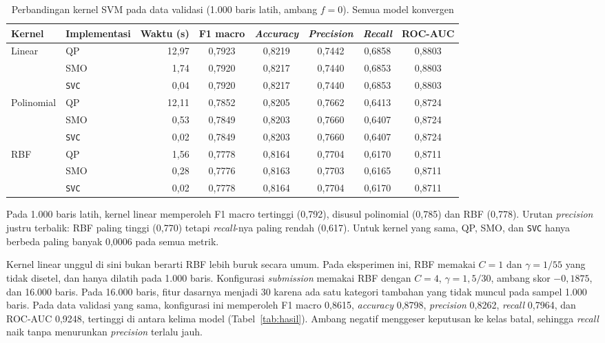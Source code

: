 \begin{table}[H]
\centering
\footnotesize
\caption{Perbandingan kernel SVM pada data validasi (1.000 baris latih, ambang $f=0$). Semua model konvergen}
\label{tab:svm-kernel}
\setlength{\tabcolsep}{4pt}
\begin{tabular}{@{}llrccccc@{}}
\toprule
Kernel & Implementasi & Waktu (s) & F1 macro & \textit{Accuracy} & \textit{Precision} & \textit{Recall} & ROC-AUC \\
\midrule
Linear & QP & 12,97 & 0,7923 & 0,8219 & 0,7442 & 0,6858 & 0,8803 \\
 & SMO & 1,74 & 0,7920 & 0,8217 & 0,7440 & 0,6853 & 0,8803 \\
 & \texttt{SVC} & 0,04 & 0,7920 & 0,8217 & 0,7440 & 0,6853 & 0,8803 \\
\midrule
Polinomial & QP & 12,11 & 0,7852 & 0,8205 & 0,7662 & 0,6413 & 0,8724 \\
 & SMO & 0,53 & 0,7849 & 0,8203 & 0,7660 & 0,6407 & 0,8724 \\
 & \texttt{SVC} & 0,02 & 0,7849 & 0,8203 & 0,7660 & 0,6407 & 0,8724 \\
\midrule
RBF & QP & 1,56 & 0,7778 & 0,8164 & 0,7704 & 0,6170 & 0,8711 \\
 & SMO & 0,28 & 0,7776 & 0,8163 & 0,7703 & 0,6165 & 0,8711 \\
 & \texttt{SVC} & 0,02 & 0,7778 & 0,8164 & 0,7704 & 0,6170 & 0,8711 \\
\bottomrule
\end{tabular}
\end{table}

Pada 1.000 baris latih, kernel linear memperoleh F1 macro tertinggi
(0,792), disusul polinomial (0,785) dan RBF (0,778). Urutan
\textit{precision} justru terbalik: RBF paling tinggi (0,770) tetapi
\textit{recall}-nya paling rendah (0,617). Untuk kernel yang sama, QP, SMO,
dan \texttt{SVC} hanya berbeda paling banyak 0,0006 pada semua metrik.

Kernel linear unggul di sini bukan berarti RBF lebih buruk secara umum. Pada
eksperimen ini, RBF memakai $C=1$ dan $\gamma=1/55$ yang tidak disetel, dan
hanya dilatih pada 1.000 baris. Konfigurasi \textit{submission} memakai RBF
dengan $C=4$, $\gamma=1{,}5/30$, ambang skor $-0{,}1875$, dan 16.000 baris.
Pada 16.000 baris, fitur dasarnya menjadi 30 karena ada satu kategori
tambahan yang tidak muncul pada sampel 1.000 baris.
Pada data validasi yang sama, konfigurasi ini memperoleh F1 macro 0,8615,
\textit{accuracy} 0,8798, \textit{precision} 0,8262, \textit{recall} 0,7964,
dan ROC-AUC 0,9248, tertinggi di antara kelima model
(Tabel~\ref{tab:hasil}). Ambang negatif menggeser keputusan ke kelas batal,
sehingga \textit{recall} naik tanpa menurunkan \textit{precision} terlalu
jauh.

